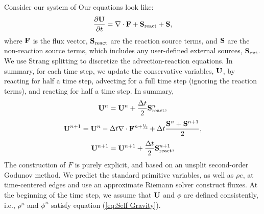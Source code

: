 Consider our system of  Our equations look like:
\begin{equation}
\frac{\partial{\bf U}}{\partial t} = \nabla\cdot{\bf F} + {\bf S}_{\rm react} + {\bf S},
\end{equation}
where ${\bf F}$ is the flux vector, ${\bf S}_{\rm react}$ are the reaction
source terms, and ${\bf S}$ are the non-reaction source terms, which
includes any user-defined external sources, ${\bf S}_{\rm ext}$.  We use
Strang splitting to discretize the advection-reaction equations.  In
summary, for each time step, we update the conservative variables,
${\bf U}$, by reacting for half a time step, advecting for a full time
step (ignoring the reaction terms), and reacting for half a time step.
In summary,
\begin{equation}
{\bf U}^n = {\bf U}^n + \frac{\Delta t}{2}{\bf S}_{\rm react}^n,
\end{equation}
\begin{equation}
\Ub^{n+1} = \Ub^n - \Delta t \nabla \cdot\Fb^\nph + \dt\frac{\Sb^n + \Sb^{n+1}}{2},
\end{equation}
\begin{equation}
{\bf U}^{n+1} = {\bf U}^{n+1} + \frac{\Delta t}{2}{\bf S}_{\rm react}^{n+1},
\end{equation}
The construction of $F$ is purely explicit, and based on an unsplit
second-order Godunov method.  We predict the standard primitive
variables, as well as $\rho e$, at time-centered edges and use an
approximate Riemann solver construct fluxes.  At the beginning of the
time step, we assume that ${\bf U}$ and $\phi$ are defined consistently,
i.e., $\rho^n$ and $\phi^n$ satisfy equation (\ref{eq:Self
  Gravity}).\\

